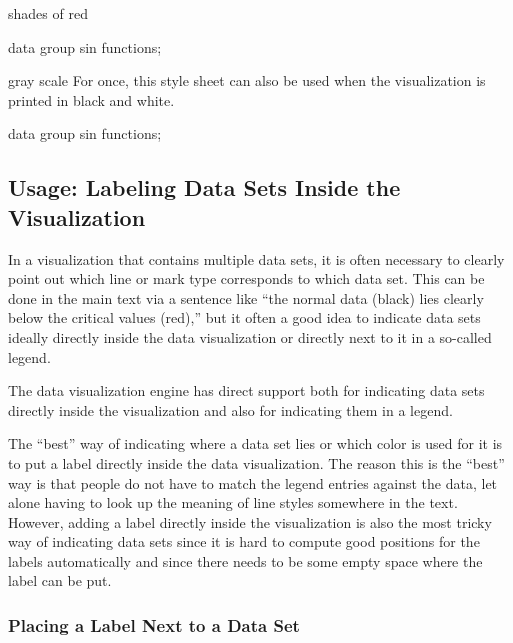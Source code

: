 \begin{stylesheet}{shades of red}
\begin{codeexample}[width=10cm]
\tikz \datavisualization [
  visualize as smooth line/.list=
    {1,2,3,4,5,6,7,8},
  example visualization,
  style sheet=shades of red]
data group {sin functions};
\end{codeexample}
\end{stylesheet}


\begin{stylesheet}{gray scale}
  For once, this style sheet can also be used when the visualization
  is printed in black and white.
\begin{codeexample}[width=10cm]
\tikz \datavisualization [
  visualize as smooth line/.list=
    {1,2,3,4,5,6,7,8},
  example visualization,
  style sheet=gray scale]
data group {sin functions};
\end{codeexample}
\end{stylesheet}


\subsection{Usage: Labeling Data Sets Inside the Visualization}

In a visualization that contains multiple data sets, it is often
necessary to clearly point out which line or mark type corresponds to
which data set. This can be done in the main text via a sentence like
``the normal data (black) lies clearly below the critical values
(red),'' but it often a good idea to indicate data sets ideally
directly inside the data visualization or directly next to it in a
so-called legend.

The data visualization engine has direct support both for indicating
data sets directly inside the visualization and also for indicating
them in a legend.

The ``best'' way of indicating where a data set lies or which color is
used for it is to put a label directly inside the data
visualization. The reason this is the ``best'' way is that people do
not have to match the legend entries against the data, let alone
having to look up the meaning of line styles somewhere in the
text. However, adding a label directly inside the visualization is
also the most tricky way of indicating data sets since it is hard to
compute good positions for the labels automatically and since there
needs to be some empty space where the label can be put.

\subsubsection{Placing a Label Next to a Data Set}

